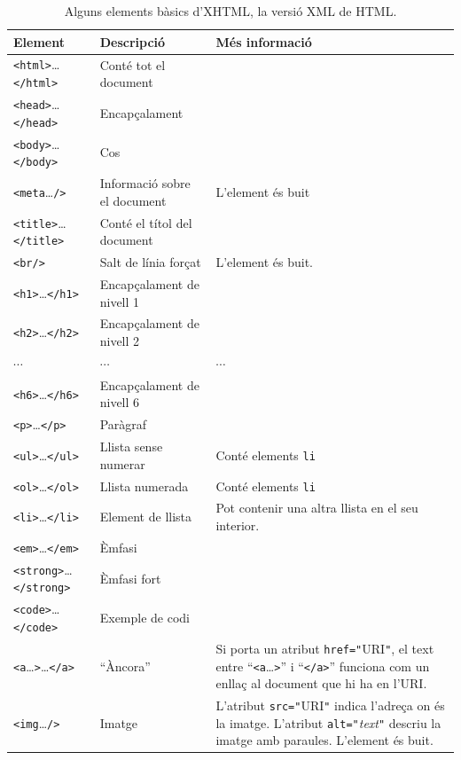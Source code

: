 \begin{table}
\caption{Alguns elements bàsics d'XHTML, la versió XML de HTML.}
\begin{center}
\begin{tabular}{l|l|p{5.5cm}}
  \hline\hline
  \textsf{Element} & \textsf{Descripció} & \textsf{Més informació} \\
  \hline
  \texttt{<html>}\ldots\texttt{</html>} & Conté tot el document & \\
  \hline
  \texttt{<head>}\ldots\texttt{</head>} & Encapçalament & \\\hline
  \texttt{<body>}\ldots\texttt{</body>} & Cos & \\\hline
  \texttt{<meta}\ldots\texttt{/>} & Informació sobre el document & L'element és
  buit \\\hline
  \texttt{<title>}\ldots\texttt{</title>} & Conté el títol del document & \\\hline
  \texttt{<br/>} & Salt de línia forçat & L'element és buit. \\\hline
  \texttt{<h1>}\ldots\texttt{</h1>} & Encapçalament de nivell 1 & \\\hline
  \texttt{<h2>}\ldots\texttt{</h2>} & Encapçalament de nivell 2 & \\\hline
  \(\cdots\) & \(\cdots\) & \(\cdots\) \\\hline
  \texttt{<h6>}\ldots\texttt{</h6>} & Encapçalament de nivell 6 & \\\hline
  \texttt{<p>}\ldots\texttt{</p>} & Paràgraf & 
  \\\hline
  \texttt{<ul>}\ldots\texttt{</ul>} & Llista sense numerar & Conté elements \texttt{li} \\\hline
  \texttt{<ol>}\ldots\texttt{</ol>} & Llista numerada & Conté elements \texttt{li} \\\hline
  \texttt{<li>}\ldots\texttt{</li>} & Element de llista & Pot contenir una altra
  llista en el seu interior. 
\\\hline
  \texttt{<em>}\ldots\texttt{</em>} & Èmfasi & \\\hline
  \texttt{<strong>}\ldots\texttt{</strong>} & Èmfasi fort & \\\hline
  \texttt{<code>}\ldots\texttt{</code>} & Exemple de codi & \\\hline
  \texttt{<a}\ldots\texttt{>}\ldots\texttt{</a>} & ``Àncora'' & Si porta un atribut
  \texttt{href="}URI\texttt{"}, el text entre ``\texttt{<a}\ldots\texttt{>}'' i
  ``\texttt{</a>}'' funciona com un enllaç al document que hi ha en l'URI.\\\hline
  \texttt{<img}\ldots\texttt{/>} & Imatge & L'atribut  \texttt{src="}URI\texttt{"} indica l'adreça on és la imatge. 
  L'atribut \texttt{alt="}\emph{text}\texttt{"} descriu la imatge amb paraules. L'element és buit.\\\hline
\end{tabular}
\end{center}
\end{table}

